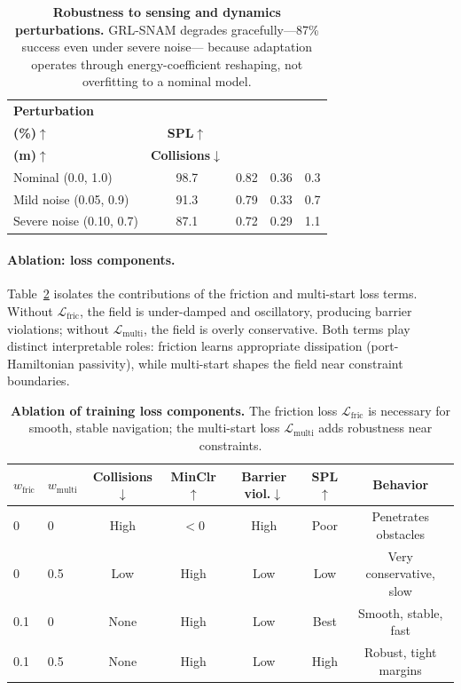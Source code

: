 \begin{table}[t]
\centering
\caption{%
  \textbf{Robustness to sensing and dynamics perturbations.}
  GRL-SNAM degrades gracefully—87\% success even under severe noise—
  because adaptation operates through energy-coefficient reshaping,
  not overfitting to a nominal model.
}
\label{tab:ch3:robustness}
\small
\setlength{\tabcolsep}{6pt}
\renewcommand{\arraystretch}{1.2}
\begin{tabular}{lcccc}
\toprule
\textbf{Perturbation} &
\makecell{\textbf{Success}\\\textbf{(\%)}$\uparrow$} &
\textbf{SPL}$\uparrow$ &
\makecell{\textbf{Min.\ Clr}\\\textbf{(m)}$\uparrow$} &
\textbf{Collisions}$\downarrow$ \\
\midrule
Nominal (0.0, 1.0)        & 98.7 & 0.82 & 0.36 & 0.3 \\
Mild noise (0.05, 0.9)    & 91.3 & 0.79 & 0.33 & 0.7 \\
Severe noise (0.10, 0.7)  & 87.1 & 0.72 & 0.29 & 1.1 \\
\bottomrule
\end{tabular}
\end{table}

\paragraph{Ablation: loss components.}
Table~\ref{tab:ch3:ablation} isolates the contributions of the
friction and multi-start loss terms.
Without $\mathcal{L}_{\mathrm{fric}}$, the field is under-damped and
oscillatory, producing barrier violations; without
$\mathcal{L}_{\mathrm{multi}}$, the field is overly conservative.
Both terms play distinct interpretable roles: friction learns appropriate
dissipation (port-Hamiltonian passivity), while multi-start shapes the
field near constraint boundaries.

\begin{table}[t]
\centering
\caption{%
  \textbf{Ablation of training loss components.}
  The friction loss $\mathcal{L}_{\mathrm{fric}}$ is necessary for
  smooth, stable navigation; the multi-start loss
  $\mathcal{L}_{\mathrm{multi}}$ adds robustness near constraints.
}
\label{tab:ch3:ablation}
\small
\setlength{\tabcolsep}{4pt}
\renewcommand{\arraystretch}{1.2}
\begin{tabular}{llccccc}
\toprule
$w_{\mathrm{fric}}$ & $w_{\mathrm{multi}}$ &
\textbf{Collisions}$\downarrow$ &
\textbf{MinClr}$\uparrow$ &
\textbf{Barrier viol.}$\downarrow$ &
\textbf{SPL}$\uparrow$ &
\textbf{Behavior} \\
\midrule
0   & 0   & High & $<0$ & High & Poor & Penetrates obstacles \\
0   & 0.5 & Low  & High & Low  & Low  & Very conservative, slow \\
0.1 & 0   & None & High & Low  & Best & Smooth, stable, fast \\
0.1 & 0.5 & None & High & Low  & High & Robust, tight margins \\
\bottomrule
\end{tabular}
\end{table}

